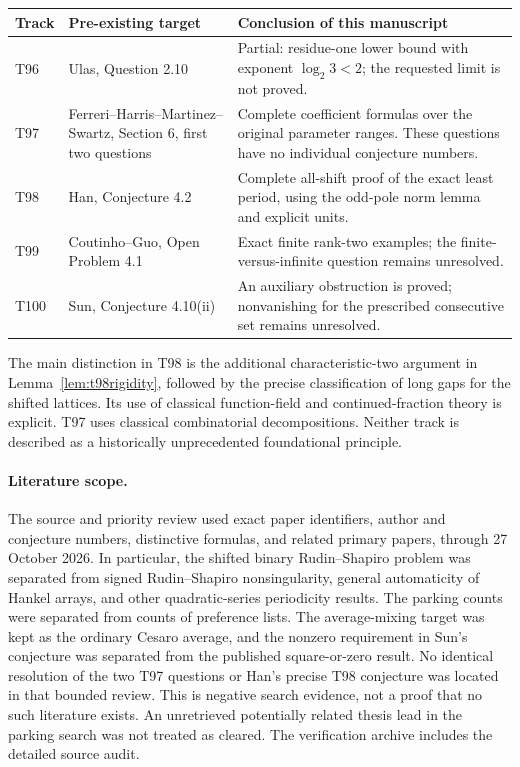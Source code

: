 \documentclass[11pt,a4paper]{article}
\theoremstyle{definition}
\theoremstyle{remark}
\begin{document}
\begin{center}\small
\begin{tabular}{@{}>{\raggedright\arraybackslash}p{}>{\raggedright\arraybackslash}p{}>{\raggedright\arraybackslash}p{}@{}}
\toprule
Track & Pre-existing target & Conclusion of this manuscript\\
\midrule
T96 & Ulas, Question 2.10 & Partial: residue-one lower bound with exponent
$\log_2 3<2$; the requested limit is not proved.\\[5pt]
T97 & Ferreri--Harris--Martinez--Swartz, Section 6, first two questions &
Complete coefficient formulas over the original parameter ranges.
These questions have no individual conjecture numbers.\\[5pt]
T98 & Han, Conjecture 4.2 & Complete all-shift proof of the exact least
period, using the odd-pole norm lemma and explicit units.\\[5pt]
T99 & Coutinho--Guo, Open Problem 4.1 & Exact finite rank-two examples;
the finite-versus-infinite question remains unresolved.\\[5pt]
T100 & Sun, Conjecture 4.10(ii) & An auxiliary obstruction is proved;
nonvanishing for the prescribed consecutive set remains unresolved.\\
\bottomrule
\end{tabular}
\end{center}

The main distinction in T98 is the additional characteristic-two
argument in Lemma~\ref{lem:t98rigidity}, followed by the precise
classification of long gaps for the shifted lattices. Its use of
classical function-field and continued-fraction theory is explicit.
T97 uses classical combinatorial decompositions. Neither track is
described as a historically unprecedented foundational principle.

\paragraph{Literature scope.}
The source and priority review used exact paper identifiers, author and
conjecture numbers, distinctive formulas, and related primary papers,
through 27 October 2026. In particular, the shifted binary
Rudin--Shapiro problem was separated from signed Rudin--Shapiro
nonsingularity, general automaticity of Hankel arrays, and other
quadratic-series periodicity results. The parking counts were separated
from counts of preference lists. The average-mixing target was kept as
the ordinary Cesaro average, and the nonzero requirement in Sun's
conjecture was separated from the published square-or-zero result.
No identical resolution of the two T97 questions or Han's precise T98
conjecture was located in that bounded review. This is negative search
evidence, not a proof that no such literature exists. An unretrieved
potentially related thesis lead in the parking search was not treated
as cleared. The verification archive includes the detailed source audit.
\end{document}
